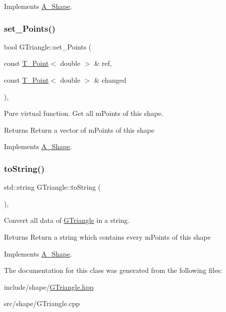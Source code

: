 Implements \hyperlink{classShape_a2dea8616fd40f2d69fd208715921982a}{A_Shape}.

\mbox{\label{classGTriangle_adb9dae329128600209c54cc4587480ee}} 
\subsubsection{\texorpdfstring{set\+\_\+\+Points()}{set\_Points()}}
{\footnotesize\ttfamily bool G\+Triangle\+::set\+\_\+\+Points (\begin{DoxyParamCaption}\item[{const \hyperlink{classPoint}{T_Point}$<$ double $>$ \&}]{ref,  }\item[{const \hyperlink{classPoint}{T_Point}$<$ double $>$ \&}]{changed }\end{DoxyParamCaption})\hspace{0.3cm}{\ttfamily [override]}, {\ttfamily [virtual]}}



Pure virtual function. Get all mPoints of this shape.

\begin{DoxyReturn}{Returns}
Return a vector of mPoints of this shape
\end{DoxyReturn}


Implements \hyperlink{classShape_a6eb0d80cccc44cb72b06c61d9780bc6b}{A_Shape}.

\mbox{\label{classGTriangle_a8381aeea39fac0d52ad9e0d45b791b3b}} 
\subsubsection{\texorpdfstring{to\+String()}{aToString()}}
{\footnotesize\ttfamily std\+::string G\+Triangle\+::to\+String (\begin{DoxyParamCaption}{ }\end{DoxyParamCaption})\hspace{0.3cm}{\ttfamily [override]}, {\ttfamily [virtual]}}



Convert all data of \hyperlink{classGTriangle}{G\+Triangle} in a string. 

\begin{DoxyReturn}{Returns}
Return a string which contains every mPoints of this shape
\end{DoxyReturn}


Implements \hyperlink{classShape_a98fa87c6dc4c7045fd6897a8f3bc186c}{A_Shape}.



The documentation for this class was generated from the following files\+:\begin{DoxyCompactItemize}
\item 
include/shape/\hyperlink{GTriangle_8hpp}{G\+Triangle.\+hpp}\item 
src/shape/G\+Triangle.\+cpp\end{DoxyCompactItemize}
